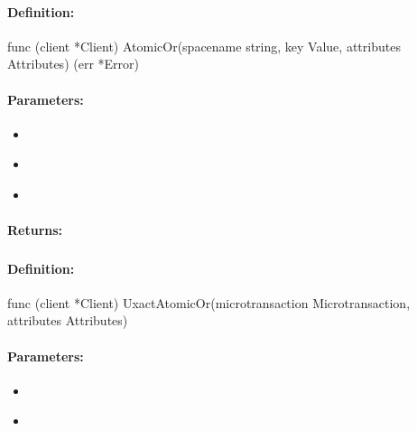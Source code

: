 \paragraph{Definition:}
\begin{gocode}
func (client *Client) AtomicOr(spacename string, key Value, attributes Attributes) (err *Error)
\end{gocode}

\paragraph{Parameters:}
\begin{itemize}[noitemsep]
\item {}\\

\item {}\\

\item {}\\

\end{itemize}

\paragraph{Returns:}


\pagebreak
\subsubsection{}
\label{api:Go:UxactAtomicOr}


\paragraph{Definition:}
\begin{gocode}
func (client *Client) UxactAtomicOr(microtransaction Microtransaction, attributes Attributes)
\end{gocode}

\paragraph{Parameters:}
\begin{itemize}[noitemsep]
\item {}\\

\item {}\\

\end{itemize}

